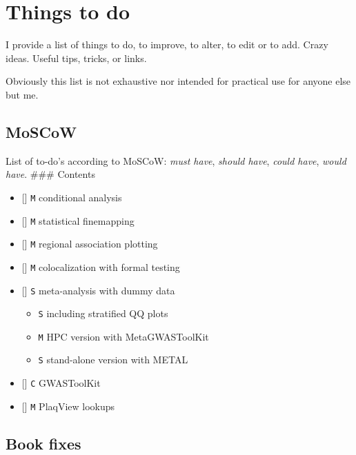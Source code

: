 \documentclass[
]{book}
\newcommand{\passthrough}[1]{#1}
\providecommand{\tightlist}{%
  \setlength{\itemsep}{0pt}\setlength{\parskip}{0pt}}
\begin{document}
\hypertarget{todo}{%
\chapter{Things to do}\label{todo}}

I provide a list of things to do, to improve, to alter, to edit or to add. Crazy ideas. Useful tips, tricks, or links.

Obviously this list is not exhaustive nor intended for practical use for anyone else but me.

\hypertarget{moscow}{%
\section{MoSCoW}\label{moscow}}

List of to-do's according to MoSCoW: \emph{must have}, \emph{should have}, \emph{could have}, \emph{would have}.
\#\#\# Contents

\begin{itemize}
\tightlist
\item
  {[}{]} \passthrough{\lstinline!M!} conditional analysis
\item
  {[}{]} \passthrough{\lstinline!M!} statistical finemapping
\item
  {[}{]} \passthrough{\lstinline!M!} regional association plotting
\item
  {[}{]} \passthrough{\lstinline!M!} colocalization with formal testing
\item
  {[}{]} \passthrough{\lstinline!S!} meta-analysis with dummy data

  \begin{itemize}
  \tightlist
  \item
    \passthrough{\lstinline!S!} including stratified QQ plots
  \item
    \passthrough{\lstinline!M!} HPC version with MetaGWASToolKit
  \item
    \passthrough{\lstinline!S!} stand-alone version with METAL
  \end{itemize}
\item
  {[}{]} \passthrough{\lstinline!C!} GWASToolKit
\item
  {[}{]} \passthrough{\lstinline!M!} PlaqView lookups
\end{itemize}

\hypertarget{book-fixes}{%
\section{Book fixes}\label{book-fixes}}
\end{document}

